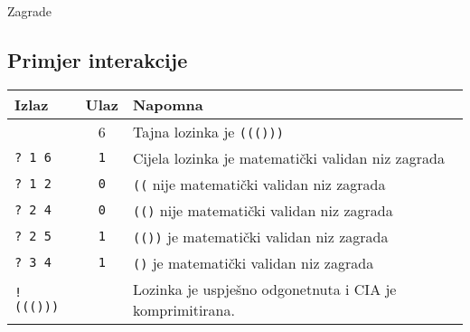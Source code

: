 \begin{statement}[
  problempoints=100,
  timelimit=1 sekunda,
  memorylimit=512 MiB,
]{Zagrade}
\subsection*{Primjer interakcije}
{\renewcommand{\arraystretch}{1.4}
  \setlength{\tabcolsep}{6pt}
  \begin{tabular}{lcl}
 Izlaz & Ulaz & Napomna \\ \midrule
      & 6 & Tajna lozinka je \texttt{((()))} \\
    \texttt{\frenchspacing? 1 6} & \texttt{1} & Cijela lozinka je matematički validan niz zagrada \\
    \texttt{\frenchspacing? 1 2} & \texttt{0} & \texttt{((} nije matematički validan niz zagrada \\
    \texttt{\frenchspacing? 2 4} & \texttt{0} & \texttt{(()} nije matematički validan niz zagrada \\
    \texttt{\frenchspacing? 2 5} & \texttt{1} & \texttt{(())} je matematički validan niz zagrada \\
    \texttt{\frenchspacing? 3 4} & \texttt{1} & \texttt{()} je matematički validan niz zagrada \\
    \texttt{\frenchspacing! ((()))} & & Lozinka je uspješno odgonetnuta i CIA je komprimitirana. \\
\end{tabular}}

\end{statement}

